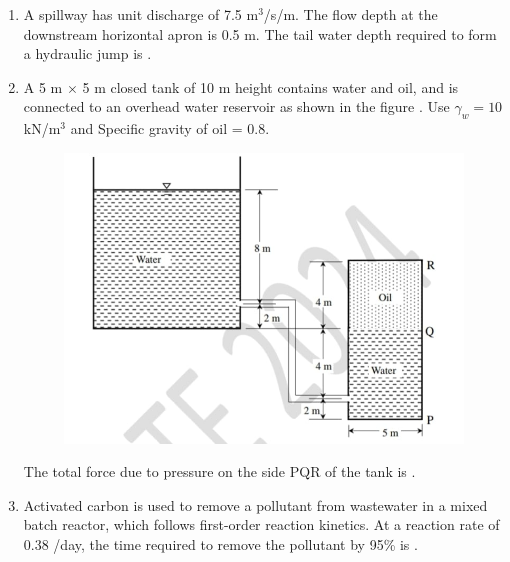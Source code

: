 \documentclass[journal,12pt,onecolumn]{article}
\theoremstyle{remark}
\begin{document}
\begin{enumerate}
    \hfill{}
    
    \item A spillway has unit discharge of 7.5 m$^3$/s/m. The flow depth at the downstream horizontal apron is 0.5 m. The tail water depth  required to form a hydraulic jump is \underline{\hspace{2cm}} .
    
    \hfill{}
    
    \item A 5 m $\times$ 5 m closed tank of 10 m height contains water and oil, and is connected to an overhead water reservoir as shown in the figure . Use $\gamma_w = 10$ kN/m$^3$ and Specific gravity of oil = 0.8.
    \begin{figure}[H]
        \centering
        \includegraphics[width=0.7\columnwidth]{figs/1Q59.jpg}
        \caption{}
        \label{fig:q59}
    \end{figure}
    The total force  due to pressure on the side PQR of the tank is \underline{\hspace{2cm}} .
    
    \hfill{}
    
    \item Activated carbon is used to remove a pollutant from wastewater in a mixed batch reactor, which follows first-order reaction kinetics.
    At a reaction rate of 0.38 /day, the time  required to remove the pollutant by 95\% is \underline{\hspace{2cm}} .
    
    \hfill{}
    

\end{enumerate}
\end{document}
